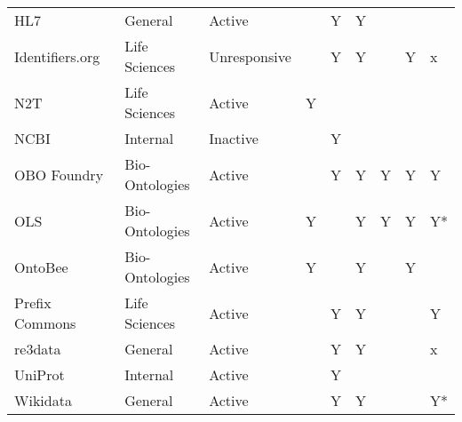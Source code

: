 \begin{table}
\begin{tabular}{lllllllll}
                  HL7~\cite{Bender2013} &         General &       Active &                           &                      Y &                              Y &                        &                      &                        \\
        Identifiers.org~\cite{Juty2012} &   Life Sciences & Unresponsive &                           &                      Y &                              Y &                        &                    Y &                      x \\
             N2T~\cite{Wimalaratne2018} &   Life Sciences &       Active &                         Y &                        &                                &                        &                      &                        \\
                  NCBI~\cite{Clark2016} &        Internal &     Inactive &                           &                      Y &                                &                        &                      &                        \\
         OBO Foundry~\cite{Jackson2021} &  Bio-Ontologies &       Active &                           &                      Y &                              Y &                      Y &                    Y &                      Y \\
                   OLS~\cite{Cote2006a} &  Bio-Ontologies &       Active &                         Y &                        &                              Y &                      Y &                    Y &                     Y* \\
                 OntoBee~\cite{Ong2017} &  Bio-Ontologies &       Active &                         Y &                        &                              Y &                        &                    Y &                        \\
    Prefix Commons~\cite{prefixcommons} &   Life Sciences &       Active &                           &                      Y &                              Y &                        &                      &                      Y \\
                                re3data &         General &       Active &                           &                      Y &                              Y &                        &                      &                      x \\
             UniProt~\cite{Bateman2021} &        Internal &       Active &                           &                      Y &                                &                        &                      &                        \\
        Wikidata~\cite{Waagmeester2020} &         General &       Active &                           &                      Y &                              Y &                        &                      &                     Y* \\
\bottomrule
\end{tabular}
\end{table}
